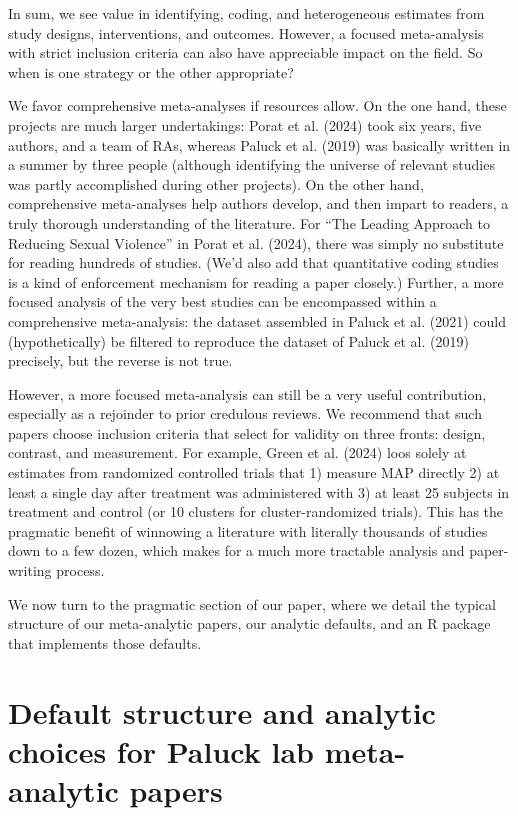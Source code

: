 \documentclass[
  ,jou]{apa6}
\begin{document}
In sum, we see value in identifying, coding, and heterogeneous estimates from study designs, interventions, and outcomes. However, a focused meta-analysis with strict inclusion criteria can also have appreciable impact on the field. So when is one strategy or the other appropriate?

We favor comprehensive meta-analyses if resources allow. On the one hand, these projects are much larger undertakings: Porat et al. (2024) took six years, five authors, and a team of RAs, whereas Paluck et al. (2019) was basically written in a summer by three people (although identifying the universe of relevant studies was partly accomplished during other projects). On the other hand, comprehensive meta-analyses help authors develop, and then impart to readers, a truly thorough understanding of the literature. For ``The Leading Approach to Reducing Sexual Violence'' in Porat et al. (2024), there was simply no substitute for reading hundreds of studies. (We'd also add that quantitative coding studies is a kind of enforcement mechanism for reading a paper closely.) Further, a more focused analysis of the very best studies can be encompassed within a comprehensive meta-analysis: the dataset assembled in Paluck et al. (2021) could (hypothetically) be filtered to reproduce the dataset of Paluck et al. (2019) precisely, but the reverse is not true.

However, a more focused meta-analysis can still be a very useful contribution, especially as a rejoinder to prior credulous reviews. We recommend that such papers choose inclusion criteria that select for validity on three fronts: design, contrast, and measurement. For example, Green et al. (2024) loos solely at estimates from randomized controlled trials that 1) measure MAP directly 2) at least a single day after treatment was administered with 3) at least 25 subjects in treatment and control (or 10 clusters for cluster-randomized trials). This has the pragmatic benefit of winnowing a literature with literally thousands of studies down to a few dozen, which makes for a much more tractable analysis and paper-writing process.

We now turn to the pragmatic section of our paper, where we detail the typical structure of our meta-analytic papers, our analytic defaults, and an R package that implements those defaults.

\section{Default structure and analytic choices for Paluck lab meta-analytic papers}\label{default-structure-and-analytic-choices-for-paluck-lab-meta-analytic-papers}
\end{document}
